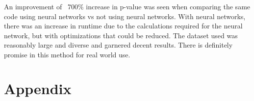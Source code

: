 \documentclass[12pt]{ucthesis}
\begin{document}
An improvement of ~700\% increase in p-value was seen when comparing the same code using neural networks vs not using neural networks. With neural networks, there was an increase in runtime due to the calculations required for the neural network, but with optimizations that could be reduced. The dataset used was reasonably large and diverse and garnered decent results. There is definitely promise in this method for real world use. 








\clearpage



\chapter{Appendix}
\end{document}
